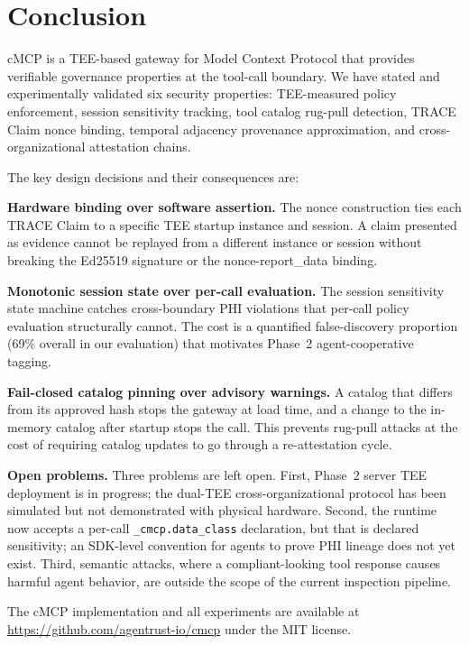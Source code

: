 \section{Conclusion}
\label{sec:conclusion}

cMCP is a TEE-based gateway for Model Context Protocol that provides verifiable governance
properties at the tool-call boundary. We have stated and experimentally validated six
security properties: TEE-measured policy enforcement, session sensitivity tracking, tool
catalog rug-pull detection, TRACE Claim nonce binding, temporal adjacency provenance
approximation, and cross-organizational attestation chains.

The key design decisions and their consequences are:

\textbf{Hardware binding over software assertion.} The nonce construction ties each TRACE
Claim to a specific TEE startup instance and session. A claim presented as evidence cannot
be replayed from a different instance or session without breaking the Ed25519 signature or
the nonce-report\_data binding.

\textbf{Monotonic session state over per-call evaluation.} The session sensitivity state
machine catches cross-boundary PHI violations that per-call policy evaluation structurally
cannot. The cost is a quantified false-discovery proportion (69\% overall in our evaluation) that
motivates Phase~2 agent-cooperative tagging.

\textbf{Fail-closed catalog pinning over advisory warnings.} A catalog that differs from
its approved hash stops the gateway at load time, and a change to the in-memory catalog
after startup stops the call. This prevents rug-pull attacks at the cost of requiring catalog updates to go through
a re-attestation cycle.

\textbf{Open problems.} Three problems are left open. First, Phase~2 server TEE deployment
is in progress; the dual-TEE cross-organizational protocol has been simulated but not
demonstrated with physical hardware. Second, the runtime now accepts a per-call \texttt{\_cmcp.data\_class}
declaration, but that is declared sensitivity; an SDK-level convention for agents to prove
PHI lineage does not yet exist.
Third, semantic attacks, where a compliant-looking tool response causes harmful agent
behavior, are outside the scope of the current inspection pipeline.

The cMCP implementation and all experiments are available at
\url{https://github.com/agentrust-io/cmcp} under the MIT license.
